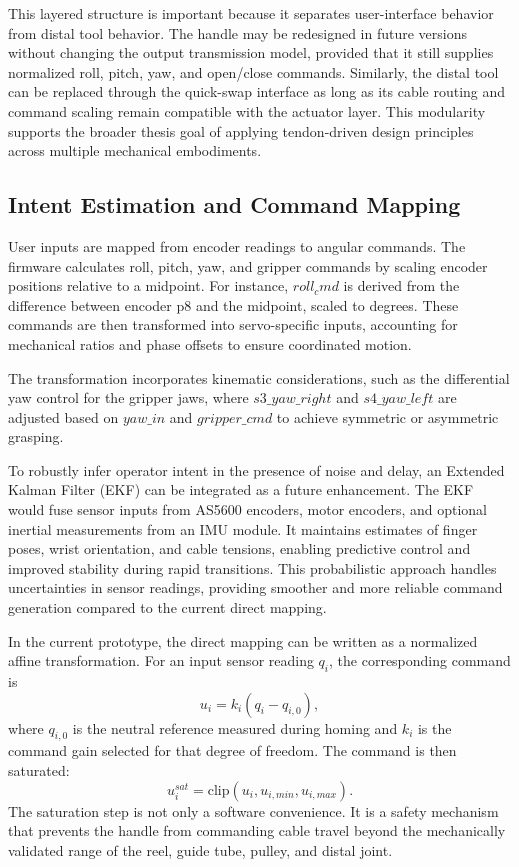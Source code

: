This layered structure is important because it separates user-interface behavior from distal tool behavior. The handle may be redesigned in future versions without changing the output transmission model, provided that it still supplies normalized roll, pitch, yaw, and open/close commands. Similarly, the distal tool can be replaced through the quick-swap interface as long as its cable routing and command scaling remain compatible with the actuator layer. This modularity supports the broader thesis goal of applying tendon-driven design principles across multiple mechanical embodiments.

\subsection{Intent Estimation and Command Mapping}
User inputs are mapped from encoder readings to angular commands. The firmware calculates roll, pitch, yaw, and gripper commands by scaling encoder positions relative to a midpoint. For instance, $roll_cmd$ is derived from the difference between encoder p8 and the midpoint, scaled to degrees. These commands are then transformed into servo-specific inputs, accounting for mechanical ratios and phase offsets to ensure coordinated motion.

The transformation incorporates kinematic considerations, such as the differential yaw control for the gripper jaws, where $s3\_yaw\_right$ and $s4\_yaw\_left$ are adjusted based on $yaw\_in$ and $gripper\_cmd$ to achieve symmetric or asymmetric grasping.

To robustly infer operator intent in the presence of noise and delay, an Extended Kalman Filter (EKF) can be integrated as a future enhancement. The EKF would fuse sensor inputs from AS5600 encoders, motor encoders, and optional inertial measurements from an IMU module. It maintains estimates of finger poses, wrist orientation, and cable tensions, enabling predictive control and improved stability during rapid transitions. This probabilistic approach handles uncertainties in sensor readings, providing smoother and more reliable command generation compared to the current direct mapping.

In the current prototype, the direct mapping can be written as a normalized affine transformation. For an input sensor reading $q_i$, the corresponding command is
\[
u_i = k_i(q_i-q_{i,0}),
\]
where $q_{i,0}$ is the neutral reference measured during homing and $k_i$ is the command gain selected for that degree of freedom. The command is then saturated:
\[
u_i^{sat}=\mathrm{clip}(u_i,u_{i,min},u_{i,max}).
\]
The saturation step is not only a software convenience. It is a safety mechanism that prevents the handle from commanding cable travel beyond the mechanically validated range of the reel, guide tube, pulley, and distal joint.

